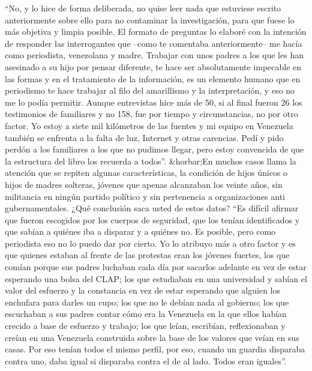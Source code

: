 \documentclass{article}%
\begin{document}
\newline%
%
“No, y lo hice de forma deliberada, no quise leer nada que estuviese escrito anteriormente sobre ello para no contaminar la investigación, para que fuese lo más objetiva y limpia posible. El formato de preguntas lo elaboré con la intención de responder las interrogantes que –como te comentaba anteriormente– me hacía como periodista, venezolana y madre. Trabajar con unos padres a los que les han asesinado a su hijo por pensar diferente, te hace ser absolutamente impecable en las formas y en el tratamiento de la información, es un elemento humano que en periodismo te hace trabajar al filo del amarillismo y la interpretación, y eso no me lo podía permitir. Aunque entrevistas hice más de 50, si al final fueron 26 los testimonios de familiares y no 158, fue por tiempo y circunstancias, no por otro factor. Yo estoy a siete mil kilómetros de las fuentes y mi equipo en Venezuela también se enfrenta a la falta de luz, Internet y otras carencias. Pedí y pido perdón a los familiares a los que no pudimos llegar, pero estoy convencida de que la estructura del libro los recuerda a todos”.%
\newline%
%
\&horbar;En muchos casos llama la atención que se repiten algunas características, la condición de hijos únicos o hijos de madres solteras, jóvenes que apenas alcanzaban los veinte años, sin militancia en ningún partido político y sin pertenencia a organizaciones anti gubernamentales. ¿Qué conclusión saca usted de estos datos?%
\newline%
%
“Es difícil afirmar que fueron escogidos por los cuerpos de seguridad, que los tenían identificados y que sabían a quiénes iba a disparar y a quiénes no. Es posible, pero como periodista eso no lo puedo dar por cierto. Yo lo atribuyo más a otro factor y es que quienes estaban al frente de las protestas eran los jóvenes fuertes, los que comían porque sus padres luchaban cada día por sacarlos adelante en vez de estar esperando una bolsa del CLAP; los que estudiaban en una universidad y sabían el valor del esfuerzo y la constancia en vez de estar esperando que alguien los enchufara para darles un cupo; los que no le debían nada al gobierno; los que escuchaban a sus padres contar cómo era la Venezuela en la que ellos habían crecido a base de esfuerzo y trabajo; los que leían, escribían, reflexionaban y creían en una Venezuela construida sobre la base de los valores que veían en sus casas. Por eso tenían todos el mismo perfil, por eso, cuando un guardia disparaba contra uno, daba igual si disparaba contra el de al lado. Todos eran iguales”.%
\end{document}

